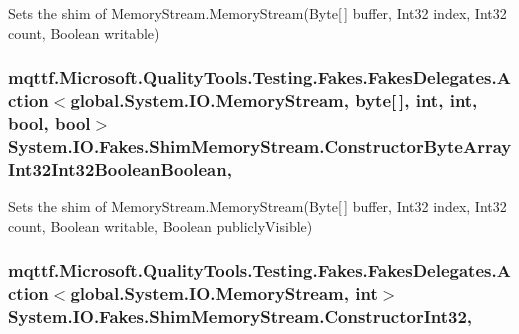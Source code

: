 Sets the shim of Memory\-Stream.\-Memory\-Stream(\-Byte\mbox{[}$\,$\mbox{]} buffer, Int32 index, Int32 count, Boolean writable)

\hypertarget{class_system_1_1_i_o_1_1_fakes_1_1_shim_memory_stream_a04d370ecb5495014d2cd3d6afe568572}{
\subsubsection[{Constructor\-Byte\-Array\-Int32\-Int32\-Boolean\-Boolean}]{\setlength{\rightskip}{0pt plus 5cm}mqttf.\-Microsoft.\-Quality\-Tools.\-Testing.\-Fakes.\-Fakes\-Delegates.\-Action$<$global.\-System.\-I\-O.\-Memory\-Stream, byte\mbox{[}$\,$\mbox{]}, int, int, bool, bool$>$ System.\-I\-O.\-Fakes.\-Shim\-Memory\-Stream.\-Constructor\-Byte\-Array\-Int32\-Int32\-Boolean\-Boolean\hspace{0.3cm}{\ttfamily [static]}, {\ttfamily [set]}}}\label{class_system_1_1_i_o_1_1_fakes_1_1_shim_memory_stream_a04d370ecb5495014d2cd3d6afe568572}


Sets the shim of Memory\-Stream.\-Memory\-Stream(\-Byte\mbox{[}$\,$\mbox{]} buffer, Int32 index, Int32 count, Boolean writable, Boolean publicly\-Visible)

\hypertarget{class_system_1_1_i_o_1_1_fakes_1_1_shim_memory_stream_a85eef910e223d1e31ccd3fbf6f85a042}{
\subsubsection[{Constructor\-Int32}]{\setlength{\rightskip}{0pt plus 5cm}mqttf.\-Microsoft.\-Quality\-Tools.\-Testing.\-Fakes.\-Fakes\-Delegates.\-Action$<$global.\-System.\-I\-O.\-Memory\-Stream, int$>$ System.\-I\-O.\-Fakes.\-Shim\-Memory\-Stream.\-Constructor\-Int32\hspace{0.3cm}{\ttfamily [static]}, {\ttfamily [set]}}}\label{class_system_1_1_i_o_1_1_fakes_1_1_shim_memory_stream_a85eef910e223d1e31ccd3fbf6f85a042}



